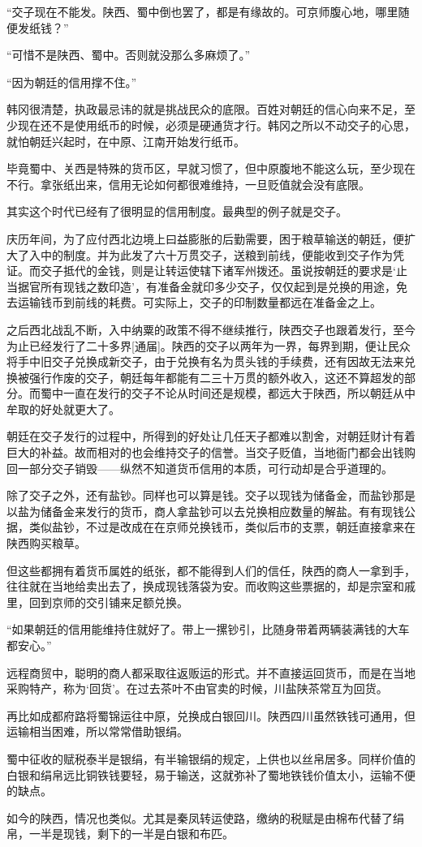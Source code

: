 “交子现在不能发。陕西、蜀中倒也罢了，都是有缘故的。可京师腹心地，哪里随便发纸钱？”

“可惜不是陕西、蜀中。否则就没那么多麻烦了。”

“因为朝廷的信用撑不住。”

韩冈很清楚，执政最忌讳的就是挑战民众的底限。百姓对朝廷的信心向来不足，至少现在还不是使用纸币的时候，必须是硬通货才行。韩冈之所以不动交子的心思，就怕朝廷兴起时，在中原、江南开始发行纸币。

毕竟蜀中、关西是特殊的货币区，早就习惯了，但中原腹地不能这么玩，至少现在不行。拿张纸出来，信用无论如何都很难维持，一旦贬值就会没有底限。

其实这个时代已经有了很明显的信用制度。最典型的例子就是交子。

庆历年间，为了应付西北边境上曰益膨胀的后勤需要，困于粮草输送的朝廷，便扩大了入中的制度。并为此发了六十万贯交子，送粮到前线，便能收到交子作为凭证。而交子抵代的金钱，则是让转运使辖下诸军州拨还。虽说按朝廷的要求是‘止当据官所有现钱之数印造’，有准备金就印多少交子，仅仅起到是兑换的用途，免去运输钱币到前线的耗费。可实际上，交子的印制数量都远在准备金之上。

之后西北战乱不断，入中纳粟的政策不得不继续推行，陕西交子也跟着发行，至今为止已经发行了二十多界[通届]。陕西的交子以两年为一界，每界到期，便让民众将手中旧交子兑换成新交子，由于兑换有名为贯头钱的手续费，还有因故无法来兑换被强行作废的交子，朝廷每年都能有二三十万贯的额外收入，这还不算超发的部分。而蜀中一直在发行的交子不论从时间还是规模，都远大于陕西，所以朝廷从中牟取的好处就更大了。

朝廷在交子发行的过程中，所得到的好处让几任天子都难以割舍，对朝廷财计有着巨大的补益。故而相对的也会维持交子的信誉。当交子贬值，当地衙门都会出钱购回一部分交子销毁——纵然不知道货币信用的本质，可行动却是合乎道理的。

除了交子之外，还有盐钞。同样也可以算是钱。交子以现钱为储备金，而盐钞那是以盐为储备金来发行的货币，商人拿盐钞可以去兑换相应数量的解盐。有有现钱公据，类似盐钞，不过是改成在在京师兑换钱币，类似后市的支票，朝廷直接拿来在陕西购买粮草。

但这些都拥有着货币属姓的纸张，都不能得到人们的信任，陕西的商人一拿到手，往往就在当地给卖出去了，换成现钱落袋为安。而收购这些票据的，却是宗室和戚里，回到京师的交引铺来足额兑换。

“如果朝廷的信用能维持住就好了。带上一摞钞引，比随身带着两辆装满钱的大车都安心。”

远程商贸中，聪明的商人都采取往返贩运的形式。并不直接运回货币，而是在当地采购特产，称为‘回货’。在过去茶叶不由官卖的时候，川盐陕茶常互为回货。

再比如成都府路将蜀锦运往中原，兑换成白银回川。陕西四川虽然铁钱可通用，但运输相当困难，所以常常借助银绢。

蜀中征收的赋税泰半是银绢，有半输银绢的规定，上供也以丝帛居多。同样价值的白银和绢帛远比铜铁钱要轻，易于输送，这就弥补了蜀地铁钱价值太小，运输不便的缺点。

如今的陕西，情况也类似。尤其是秦凤转运使路，缴纳的税赋是由棉布代替了绢帛，一半是现钱，剩下的一半是白银和布匹。
